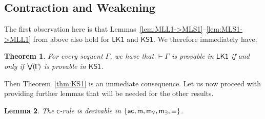 \documentclass[conference,twosided,10pt]{IEEEtran}
\newtheorem{thm}{Theorem}%
\newtheorem{lemma}[thm]{Lemma}
\theoremstyle{definition}
\newcommand{\fequ}{\equiv}
\newcommand*{\FOLK}{\mathsf{LK1}}
\newcommand*{\FOKS}{\mathsf{KS1}}
\renewcommand\cD {\mathsf{c}}
\renewcommand\acD {\mathsf{ac}}
\newcommand\mfaD {\mathsf{m_\forall}}
\newcommand\mexD {\mathsf{m_\exists}}
\newcommand{\set}[1]{\{#1\}}
\newcommand{\sqn}[1]{\vdash#1}
\newcommand{\form}[1]{\bigvee\mkern-1mu(\mkern-2mu #1\mkern-2mu)}
\begin{document}
\subsection{Contraction and Weakening}

The first observation here is that Lemmas~\ref{lem:MLL1->MLS1}--\ref{lem:MLS1->MLL1} from above also hold for $\FOLK$ and $\FOKS$. We therefore immediately have:

\begin{thm}\label{thm:LK1-KS1}
  For every sequent $\Gamma$, we have that $\sqn\Gamma$ is provable in
  $\FOLK$ if and only if $\form\Gamma$ is provable in $\FOKS$.
\end{thm}

Then Theorem~\ref{thm:KS1} is an immediate consequence. Let us now
proceed with providing further lemmas that will be needed for the
other results.

\begin{lemma}
  \label{lem:ac}
  The $\cD$-rule is derivable in $\set{\acD,\me,\mfaD,\mexD,\fequ}$. 
\end{lemma}
\end{document}
